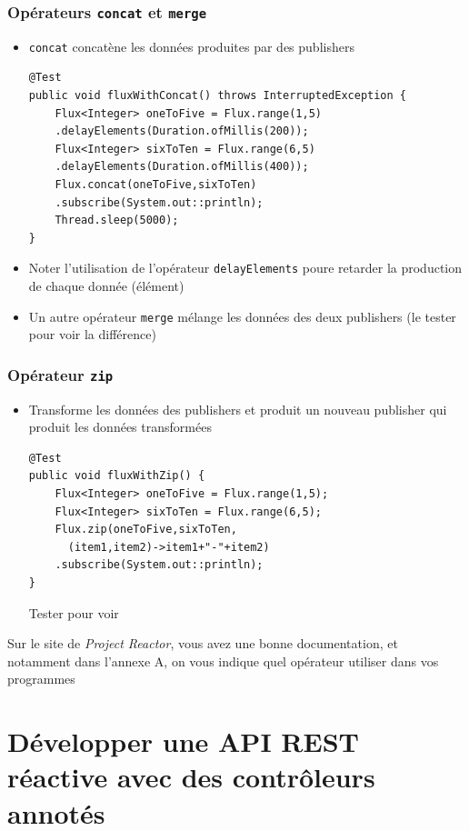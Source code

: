 \documentclass{beamer}
\begin{document}
\begin{frame}[fragile]
	\frametitle{Opérateurs \texttt{concat} et \texttt{merge}}
	\begin{itemize}
		\item \texttt{concat} concatène les données produites par des publishers
\begin{lstlisting}
@Test
public void fluxWithConcat() throws InterruptedException {
	Flux<Integer> oneToFive = Flux.range(1,5)
	.delayElements(Duration.ofMillis(200));
	Flux<Integer> sixToTen = Flux.range(6,5)
	.delayElements(Duration.ofMillis(400));
	Flux.concat(oneToFive,sixToTen)
	.subscribe(System.out::println);
	Thread.sleep(5000);
}
\end{lstlisting}
\item Noter l'utilisation de l'opérateur \texttt{delayElements} poure retarder la production de chaque donnée (élément)
\item Un autre opérateur \texttt{merge} mélange les données des deux publishers
(le tester pour voir la différence)
	\end{itemize}
\end{frame}

\begin{frame}[fragile]
	\frametitle{Opérateur \texttt{zip}}
	\begin{itemize}
		\item Transforme les données des publishers et produit un nouveau publisher qui produit les données transformées
\begin{lstlisting}
@Test
public void fluxWithZip() {
	Flux<Integer> oneToFive = Flux.range(1,5);
	Flux<Integer> sixToTen = Flux.range(6,5);
	Flux.zip(oneToFive,sixToTen,
	  (item1,item2)->item1+"-"+item2)
	.subscribe(System.out::println);
}
\end{lstlisting}
Tester pour voir
	\end{itemize}
Sur le site de \textit{Project Reactor}, vous avez une bonne documentation, et notamment dans l'annexe A, on vous indique quel opérateur utiliser dans vos programmes
\end{frame}


\section{Développer une API REST réactive avec des contrôleurs annotés}
\end{document}
